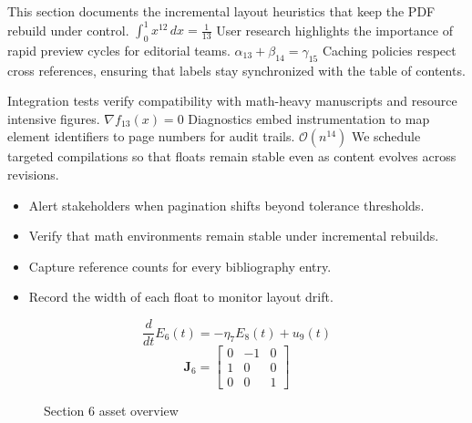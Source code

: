     This section documents the incremental layout heuristics that keep the PDF rebuild under control.  $\int_{0}^{1} x^{12} \, dx = \frac{1}{13}$  User research highlights the importance of rapid preview cycles for editorial teams.  $\alpha_{13} + \beta_{14} = \gamma_{15}$  Caching policies respect cross references, ensuring that labels stay synchronized with the table of contents.
    \par
  
    Integration tests verify compatibility with math-heavy manuscripts and resource intensive figures.  $\nabla f_{13}(x) = 0$  Diagnostics embed instrumentation to map element identifiers to page numbers for audit trails.  $\mathcal{O}(n^{14})$  We schedule targeted compilations so that floats remain stable even as content evolves across revisions.
    \par
  
    \begin{itemize}
      
    \item Alert stakeholders when pagination shifts beyond tolerance thresholds.
    \item Verify that math environments remain stable under incremental rebuilds.
    \item Capture reference counts for every bibliography entry.
    \item Record the width of each float to monitor layout drift.
    \end{itemize}
\begin{equation}
\label{eq:sec6-eq1}
\frac{d}{dt} E_{6}(t) = -\eta_{7} E_{8}(t) + u_{9}(t)
\end{equation}
\[
\mathbf{J}_{6} = \begin{bmatrix} 0 & -1 & 0 \\ 1 & 0 & 0 \\ 0 & 0 & 1 \end{bmatrix}
\]

    \begin{figure}[htbp]
      \centering
        \caption{Section 6 asset overview}
      
        \label{fig:fig-sec6}
      
    \end{figure}
  
